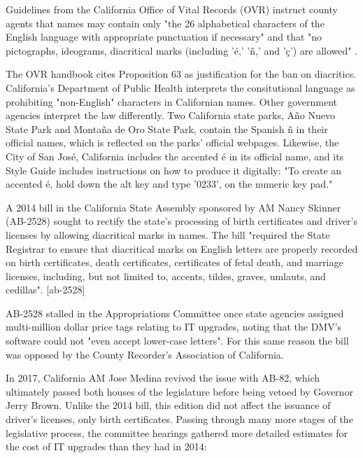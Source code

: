 Guidelines from the California Office of Vital Records (OVR) instruct county
agents that names may contain only "the 26 alphabetical characters of the
English language with appropriate punctuation if necessary" and that "no
pictographs, ideograms, diacritical marks (including 'é,' 'ñ,' and 'ç') are
allowed" \parencite{larson11}.

The OVR handbook cites Proposition 63 as justification for the ban on
diacritics. California's Department of Public Health interprets the
consitutional language as prohibiting "non-English" characters in Californian
names. Other government agencies interpret the law differently. Two California
state parks, Año Nuevo State Park and Montaña de Oro State Park, contain the
Spanish ñ in their official names, which is reflected on the parks' official
webpages. \parencite{año-nuevo} \parencite{montaña-de-oro} Likewise, the City of
San José, California includes the accented é in its official name, and its Style
Guide includes instructions on how to produce it digitally: "To create an
accented é, hold down the alt key and type '0233'‚ on the numeric key pad."
\textcite{san-josé}

A 2014 bill in the California State Assembly sponsored by AM Nancy Skinner
(AB-2528) sought to rectify the state's processing of birth certificates and
driver's licenses by allowing diacritical marks in names. The bill "required the
State Registrar to ensure that diacritical marks on English letters are properly
recorded on birth certificates, death certificates, certificates of fetal death,
and marriage licenses, including, but not limited to, accents, tildes, graves,
umlauts, and cedillas". [ab-2528]

AB-2528 stalled in the Appropriations Committee once state agencies assigned
multi-million dollar price tags relating to IT upgrades, noting that the DMV's
software could not "even accept lower-case letters". For this same reason the
bill was opposed by the County Recorder's Association of California.

In 2017, California AM Jose Medina revived the issue with AB-82, which
ultimately passed both houses of the legislature before being vetoed by Governor
Jerry Brown. Unlike the 2014 bill, this edition did not affect the issuance of
driver's licenses, only birth certificates. Passing through many more stages of
the legislative process, the committee hearings gathered more detailed estimates
for the cost of IT upgrades than they had in 2014:


